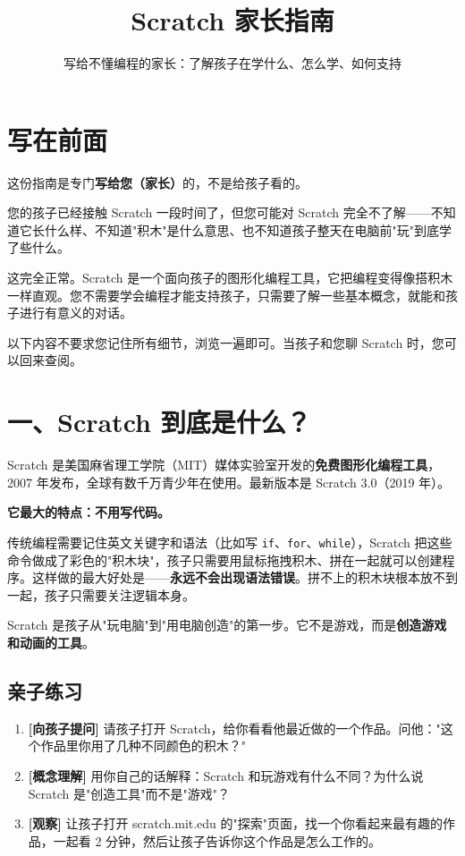 \documentclass[a4paper,12pt]{ctexart}
\title{\textcolor{blue!70!black}{\Huge\textbf{Scratch 家长指南}}}
\author{写给不懂编程的家长：了解孩子在学什么、怎么学、如何支持}
\date{}
\begin{document}
\maketitle
\thispagestyle{empty}

\section*{写在前面}

这份指南是专门\textbf{写给您（家长）}的，不是给孩子看的。

您的孩子已经接触 Scratch 一段时间了，但您可能对 Scratch 完全不了解——不知道它长什么样、不知道"积木"是什么意思、也不知道孩子整天在电脑前"玩"到底学了些什么。

这完全正常。Scratch 是一个面向孩子的图形化编程工具，它把编程变得像搭积木一样直观。您不需要学会编程才能支持孩子，只需要了解一些基本概念，就能和孩子进行有意义的对话。

以下内容不要求您记住所有细节，浏览一遍即可。当孩子和您聊 Scratch 时，您可以回来查阅。

\section*{一、Scratch 到底是什么？}

Scratch 是美国麻省理工学院（MIT）媒体实验室开发的\textbf{免费图形化编程工具}，2007 年发布，全球有数千万青少年在使用。最新版本是 Scratch 3.0（2019 年）。

\textbf{它最大的特点：不用写代码。}

传统编程需要记住英文关键字和语法（比如写 \texttt{if}、\texttt{for}、\texttt{while}），Scratch 把这些命令做成了彩色的"积木块"，孩子只需要用鼠标拖拽积木、拼在一起就可以创建程序。这样做的最大好处是——\textbf{永远不会出现语法错误}。拼不上的积木块根本放不到一起，孩子只需要关注逻辑本身。

Scratch 是孩子从"玩电脑"到"用电脑创造"的第一步。它不是游戏，而是\textbf{创造游戏和动画的工具}。

\subsection*{亲子练习}

\begin{enumerate}
  \item \textbf{[向孩子提问]} 请孩子打开 Scratch，给你看看他最近做的一个作品。问他："这个作品里你用了几种不同颜色的积木？"
  \item \textbf{[概念理解]} 用你自己的话解释：Scratch 和玩游戏有什么不同？为什么说 Scratch 是"创造工具"而不是"游戏"？
  \item \textbf{[观察]} 让孩子打开 scratch.mit.edu 的"探索"页面，找一个你看起来最有趣的作品，一起看 2 分钟，然后让孩子告诉你这个作品是怎么工作的。
\end{enumerate}
\end{document}

